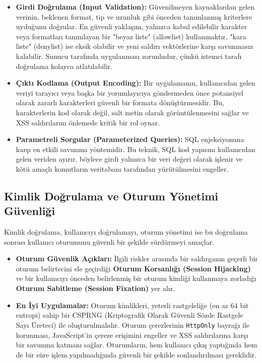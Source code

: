 \begin{itemize}
\item \textbf{Girdi Doğrulama (Input Validation):} Güvenilmeyen kaynaklardan gelen verinin, beklenen format, tip ve uzunluk gibi önceden tanımlanmış kriterlere uyduğunu doğrular. En güvenli yaklaşım, yalnızca kabul edilebilir karakter veya formatları tanımlayan bir "beyaz liste" (allowlist) kullanmaktır, "kara liste" (denylist) ise eksik olabilir ve yeni saldırı vektörlerine karşı savunmasız kalabilir. Sunucu tarafında uygulanması zorunludur, çünkü istemci tarafı doğrulama kolayca atlatılabilir.
\item \textbf{Çıktı Kodlama (Output Encoding):} Bir uygulamanın, kullanıcıdan gelen veriyi tarayıcı veya başka bir yorumlayıcıya göndermeden önce potansiyel olarak zararlı karakterleri güvenli bir formata dönüştürmesidir. Bu, karakterlerin kod olarak değil, salt metin olarak görüntülenmesini sağlar ve XSS saldırılarını önlemede kritik bir rol oynar.
\item \textbf{Parametreli Sorgular (Parameterized Queries):} SQL enjeksiyonuna karşı en etkili savunma yöntemidir. Bu teknik, SQL kod yapısını kullanıcıdan gelen veriden ayırır, böylece girdi yalnızca bir veri değeri olarak işlenir ve kötü amaçlı komutların veritabanı tarafından yürütülmesini engeller.
\end{itemize}

\subsection{Kimlik Doğrulama ve Oturum Yönetimi Güvenliği}

Kimlik doğrulama, kullanıcıyı doğrulamayı, oturum yönetimi ise bu doğrulama sonrası kullanıcı oturumunu güvenli bir şekilde sürdürmeyi amaçlar.

\begin{itemize}
\item \textbf{Oturum Güvenlik Açıkları:} İlgili riskler arasında bir saldırganın geçerli bir oturum belirtecini ele geçirdiği \textbf{Oturum Korsanlığı (Session Hijacking)} ve bir kullanıcıyı önceden belirlenmiş bir oturum kimliği kullanmaya zorladığı \textbf{Oturum Sabitleme (Session Fixation)} yer alır.
\item \textbf{En İyi Uygulamalar:} Oturum kimlikleri, yeterli rastgeleliğe (en az 64 bit entropi) sahip bir CSPRNG (Kriptografik Olarak Güvenli Sözde Rastgele Sayı Üreteci) ile oluşturulmalıdır. Oturum çerezlerinin \texttt{HttpOnly} bayrağı ile korunması, JavaScript'in çereze erişimini engeller ve XSS saldırılarına karşı bir savunma katmanı sağlar. Oturumların, hem kullanıcı çıkış yaptığında hem de bir süre işlem yapılmadığında güvenli bir şekilde sonlandırılması gereklidir.
\end{itemize}

